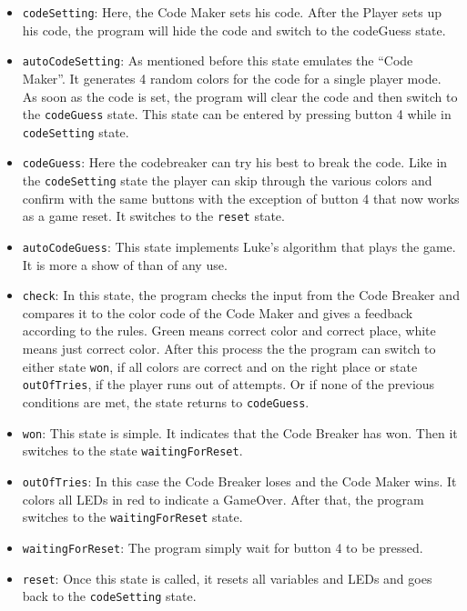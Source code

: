 \documentclass[a4paper, 11pt]{article}
\begin{document}
\begin{itemize}

    \item {\tt codeSetting}: Here, the Code Maker sets his code. After
        the Player sets up his code, the program will hide the code and
        switch to the codeGuess state.

    \item {\tt autoCodeSetting}: As mentioned before this state emulates the
        “Code Maker”. It generates 4 random colors for the code for a
        single player mode. As soon as the code is set, the program will
        clear the code and then switch to the {\tt codeGuess} state. This
        state can be entered by pressing button 4 while in {\tt codeSetting}
        state. 

    \item {\tt codeGuess}: Here the codebreaker can try his best to break the
        code. Like in the {\tt codeSetting} state the player can skip through
        the various colors and confirm with the same buttons with the
        exception of button 4 that now works as a game reset. It
        switches to the {\tt reset} state. 

    \item {\tt autoCodeGuess}: This state implements Luke’s algorithm that
        plays the game. It is more a show of than of any use. 

    \item {\tt check}: In this state, the program checks the input from the
        Code Breaker and compares it to the color code of the Code Maker
        and gives a feedback according to the rules. Green means correct
        color and correct place, white means just correct color. After
        this process the the program can switch to either state {\tt won}, if
        all colors are correct and on the right place or state
        {\tt outOfTries}, if the player runs out of attempts. Or if none of
        the previous conditions are met, the state returns to {\tt codeGuess}. 

    \item {\tt won}: This state is simple. It indicates that the Code Breaker
        has won. Then it switches to the state {\tt waitingForReset}.

    \item {\tt outOfTries}: In this case the Code Breaker loses and the Code
        Maker wins. It colors all LEDs in red to indicate a GameOver.
        After that, the program switches to the {\tt waitingForReset} state.

    \item {\tt waitingForReset}: The program simply wait for button 4 to
        be pressed.
        
    \item {\tt reset}: Once this state is called, it resets all variables and
        LEDs and goes back to the {\tt codeSetting} state. 

\end{itemize}
\end{document}
